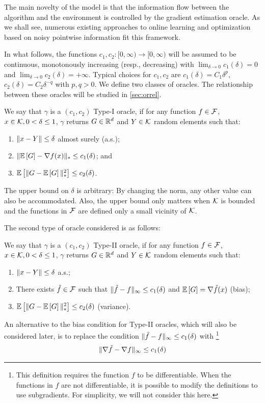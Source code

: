 The main novelty of the model is that the information flow between the algorithm and the environment is controlled by the gradient estimation oracle. As we shall see, numerous existing approaches to online learning and optimization based on noisy pointwise information fit this framework. 

In what follows, the functions $c_1,c_2:[0,\infty)\to [0,\infty)$ will be assumed to be continuous, 
monotonously increasing (resp., decreasing) with 
$\lim_{\delta\to  0} c_1(\delta)=0$ and $\lim_{\delta\to 0} c_2(\delta)=+\infty$.
Typical choices for $c_1,c_2$ are $c_1(\delta) = C_1 \delta^p$, $c_2(\delta) = C_2\delta^{-q}$ with $p,q>0$.
We define two classes of oracles. The relationship between these oracles will be studied in \cref{sec:orrel}.
\begin{definition}
\label{def:oracle1}
We say that $\gamma$ is a  $(c_1,c_2)$ Type-I oracle, if for any function $f\in \mathcal{F}$,
$x\in \mathcal{K},0<\delta\le 1$, $\gamma$ returns $G\in \mathbb{R}^d$ and  $Y\in \mathcal{K}$ random elements such that:
\begin{enumerate}
\item $\|x-Y\|\le \delta$ almost surely (a.s.);
\item $\| \mathbb{E}\left[G\right]  - \nabla f(x)  \|_* \le c_1(\delta) $; and
\item $\mathbb{E}\left[\| G -  \mathbb{E}\left[G\right] \|_*^2\right] \le c_2(\delta)$.
\end{enumerate}
\end{definition}
The upper bound on $\delta$ is arbitrary: By changing the norm, any other value can also be accommodated. Also, the upper bound only matters when $\mathcal{K}$ is bounded and the functions in $\mathcal{F}$ are defined only a small vicinity of $\mathcal{K}$.

The second type of oracle considered is as follows:
\begin{definition}
\label{def:oracle2}
We say that $\gamma$ is a  $(c_1,c_2)$ Type-II oracle, if for any function $f\in \mathcal{F}$,
$x\in \mathcal{K},0<\delta\le 1$, $\gamma$ returns $G\in \mathbb{R}^d$ and  $Y\in \mathcal{K}$ random elements such that:
\begin{enumerate}
\item $\|x-Y\|\le \delta$ a.s.;
\item There exists $\tilde{f} \in \mathcal{F}$ such that  
$\|\tilde{f}- f\|_\infty \le c_1(\delta)$  and
$\mathbb{E}\left[G\right]  = \nabla \tilde{f}(x)$ (bias);
\item $\mathbb{E}\left[\| G -  \mathbb{E}\left[G\right] \|_*^2\right] \le c_2(\delta)$ (variance).
\end{enumerate}
\end{definition}
An alternative to the bias condition for Type-II oracles, which will also be considered later, is to replace the condition $\|\tilde{f}-f\|_\infty \le c_1(\delta)$ with%
\footnote{
This definition requires the function $f$ to be differentiable. When the functions in $f$ are not differentiable, it is possible
to modify the definitions to use subgradients. For simplicity, we will not consider this here.
}
\begin{align}
\label{eq:oracle2alt}
\|\nabla \tilde{f}- \nabla f\|_\infty \le c_1(\delta)
\end{align}

